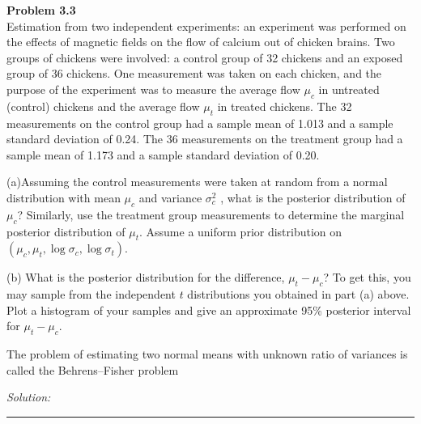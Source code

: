 \documentclass[a4paper, 11pt]{article}
\newenvironment{problem}[2][Problem]
    { \begin{mdframed}[backgroundcolor=gray!20] \textbf{#1 #2} \\}
    {  \end{mdframed}}
\newenvironment{solution}
    {\textit{Solution:}}
    {}
\begin{document}
\begin{problem}{3.3}
  Estimation from two independent experiments: an experiment was performed on the effects of magnetic fields on the flow of calcium out of chicken 
  brains. Two groups of chickens were involved: a control group of 32 chickens and an exposed group of 36 chickens. 
  One measurement was taken on each chicken, and the purpose of the experiment was to measure the average flow $\mu_c$ in untreated (control) chickens 
  and the average flow $\mu_t$ in treated chickens. The 32 measurements on the control group had a sample mean of 1.013 and a sample 
  standard deviation of 0.24. The 36 measurements on the treatment group had a sample mean of 1.173 and a sample standard deviation of 0.20.

  (a)Assuming the control measurements were taken at random from a normal distribution with mean $\mu_c$ and variance 
  $\sigma_c^2$ , what is the posterior distribution of $\mu_c$? Similarly, use the treatment group measurements to determine the marginal posterior 
  distribution of $\mu_t$. Assume a uniform prior distribution on $(\mu_c, \mu_t, \log \sigma_c, \log \sigma_t)$.
  
  (b) What is the posterior distribution for the difference, $\mu_t-\mu_c$? To get this, you may sample from the independent $t$ 
  distributions you obtained in part (a) above. Plot a histogram of your samples and give an approximate 95\% posterior interval for $\mu_t-\mu_c$.
  
  The problem of estimating two normal means with unknown ratio of variances is called the Behrens–Fisher problem
\end{problem}
\begin{solution}

\end{solution}

\noindent\rule{7in}{2.8pt}

\end{document}
